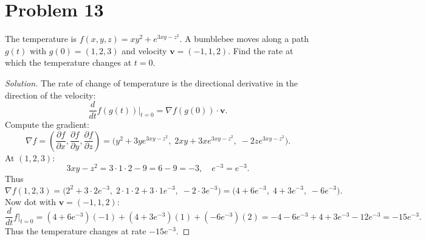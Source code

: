 \documentclass{article}
\begin{document}
\section*{Problem 13}
The temperature is \(f(x,y,z)=xy^2+e^{3xy-z^2}\). A bumblebee moves along a path \(g(t)\) with \(g(0)=(1,2,3)\) and velocity \(\mathbf{v}=(-1,1,2)\). Find the rate at which the temperature changes at \(t=0\).

\begin{proof}[Solution]
	The rate of change of temperature is the directional derivative in the direction of the velocity:
	\[
		\frac{d}{dt}f(g(t))\big|_{t=0}=\nabla f(g(0))\cdot \mathbf{v}.
	\]
	Compute the gradient:
	\[
		\nabla f=\left(\frac{\partial f}{\partial x},\frac{\partial f}{\partial y},\frac{\partial f}{\partial z}\right)
		=\bigl(y^2+3ye^{3xy-z^2},\;2xy+3xe^{3xy-z^2},\;-2ze^{3xy-z^2}\bigr).
	\]
	At \((1,2,3)\):
	\[
		3xy-z^2=3\cdot1\cdot2-9=6-9=-3,\quad e^{-3}=e^{-3}.
	\]
	Thus
	\[
		\nabla f(1,2,3)=\bigl(2^2+3\cdot2e^{-3},\;2\cdot1\cdot2+3\cdot1e^{-3},\;-2\cdot3e^{-3}\bigr)
		=\bigl(4+6e^{-3},\;4+3e^{-3},\;-6e^{-3}\bigr).
	\]
	Now dot with \(\mathbf{v}=(-1,1,2)\):
	\[
		\frac{d}{dt}f\big|_{t=0}=(4+6e^{-3})(-1)+(4+3e^{-3})(1)+(-6e^{-3})(2)
		= -4-6e^{-3}+4+3e^{-3}-12e^{-3}= -15e^{-3}.
	\]
	Thus the temperature changes at rate \(-15e^{-3}\).
\end{proof}
\end{document}

